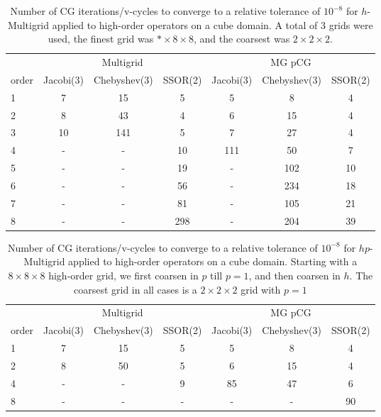 
\begin{table}
  \caption{\label{tab:homg} Number of CG iterations/v-cycles to converge to a relative tolerance of $10^{-8}$ for $h$-Multigrid applied to high-order operators on a cube domain. A total of 3 grids were used, the finest grid was $*\times 8\times 8$, and the coarsest was $2\times 2\times 2$.}
		\centering
    \begin{tabular}{|l|c|c|c|c|c|c|} 
	    \hline
				    & \multicolumn{3}{c|}{Multigrid} & \multicolumn{3}{c|}{MG pCG}\\  \cline{2-7}
			order & \scriptsize Jacobi(3)  &\scriptsize  Chebyshev(3)  &\scriptsize SSOR(2) &\scriptsize Jacobi(3)  &\scriptsize  Chebyshev(3)  &\scriptsize SSOR(2) \\
			\hline
        1 & 7 & 15 & 5 & 5 & 8 & 4 \\
	    	2 & 8 & 43 & 4 & 6 & 15 & 4 \\
        3 & 10 & 141 & 5 & 7 & 27 & 4 \\
        4 & - & - & 10 & 111 & 50 & 7 \\
				5 & - & - & 19 & - & 102 & 10 \\
        6 & - & - & 56 & - & 234 & 18 \\
				
        7 & - & - & 81 & - & 105 & 21 \\
				8 & - & - & 298 & - & 204 & 39 \\
			\hline
	  \end{tabular}
\end{table}

\begin{table}
  \caption{\label{tab:hpmg} Number of CG iterations/v-cycles to converge to a relative tolerance of $10^{-8}$ for $hp$-Multigrid applied to high-order operators on a cube domain. Starting with a $8\times 8\times 8$ high-order grid, we first coarsen in $p$ till $p=1$, and then coarsen in $h$. The coarsest grid in all cases is a $2\times 2\times 2$ grid with $p=1$}
		\centering
		\begin{tabular}{|l|c|c|c|c|c|c|} 
	    \hline
				    & \multicolumn{3}{c|}{Multigrid} & \multicolumn{3}{c|}{MG pCG}\\  \cline{2-7}
			order & \scriptsize Jacobi(3)  &\scriptsize  Chebyshev(3)  &\scriptsize SSOR(2) &\scriptsize Jacobi(3)  &\scriptsize  Chebyshev(3)  &\scriptsize SSOR(2) \\
			\hline
        1 & 7 & 15 & 5 & 5 & 8 & 4 \\
        2 & 8 & 50 & 5 & 6 & 15 & 4 \\
			  4 & - & - & 9 & 85 & 47 & 6 \\
        8 & - & - & - & -  &  - & 90 \\
      \hline
	  \end{tabular}
\end{table}

